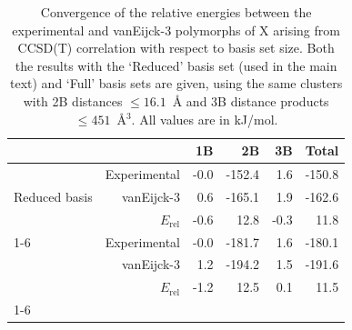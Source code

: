 \begin{table}[h]

\caption{\label{tab:x_method_convergence}Convergence of the relative energies between the experimental and vanEijck-3 polymorphs of X arising from CCSD(T) correlation with respect to basis set size. Both the results with the `Reduced' basis set (used in the main text) and `Full' basis sets are given, using the same clusters with 2B distances $\leq 16.1$~\AA{} and 3B distance products $\leq 451$~\AA{}$^3$. All values are in kJ/mol.}
\begin{tabular}{lrrrrr}
\toprule
 &  & 1B & 2B & 3B & Total \\ 
\midrule
\multirow[c]{3}{*}{Reduced basis} & Experimental & -0.0 & -152.4 & 1.6 & -150.8 \\
 & vanEijck-3 & 0.6 & -165.1 & 1.9 & -162.6 \\
 & $E_\text{rel}$ & -0.6 & 12.8 & -0.3 & 11.8 \\
\cline{1-6}
\multirow[c]{3}{*}{Full basis} & Experimental & -0.0 & -181.7 & 1.6 & -180.1 \\
 & vanEijck-3 & 1.2 & -194.2 & 1.5 & -191.6 \\
 & $E_\text{rel}$ & -1.2 & 12.5 & 0.1 & 11.5 \\
\cline{1-6}
\bottomrule
\end{tabular}

\end{table}